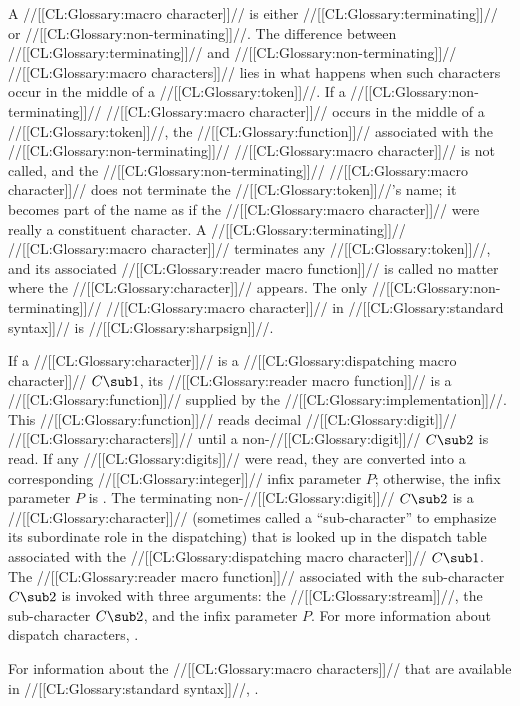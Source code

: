 A //[[CL:Glossary:macro character]]// is either //[[CL:Glossary:terminating]]// or //[[CL:Glossary:non-terminating]]//.
The difference between //[[CL:Glossary:terminating]]// and //[[CL:Glossary:non-terminating]]// //[[CL:Glossary:macro characters]]// 
lies in what happens when such characters occur in the middle of a //[[CL:Glossary:token]]//.  
If a //[[CL:Glossary:non-terminating]]// //[[CL:Glossary:macro character]]// occurs in the middle of a //[[CL:Glossary:token]]//,
the //[[CL:Glossary:function]]// associated 
with the //[[CL:Glossary:non-terminating]]// //[[CL:Glossary:macro character]]// is not called,
and the
//[[CL:Glossary:non-terminating]]// //[[CL:Glossary:macro character]]// does not terminate the //[[CL:Glossary:token]]//'s name; it
becomes part of the name as if the //[[CL:Glossary:macro character]]// were really a constituent
character.  A //[[CL:Glossary:terminating]]// //[[CL:Glossary:macro character]]// terminates any //[[CL:Glossary:token]]//,
and its associated //[[CL:Glossary:reader macro function]]//
is called no matter where the //[[CL:Glossary:character]]// appears.
The only //[[CL:Glossary:non-terminating]]// //[[CL:Glossary:macro character]]// in //[[CL:Glossary:standard syntax]]// 
is //[[CL:Glossary:sharpsign]]//.

If a //[[CL:Glossary:character]]// is a //[[CL:Glossary:dispatching macro character]]// $C\sub 1$,
its //[[CL:Glossary:reader macro function]]// is a //[[CL:Glossary:function]]// supplied by the //[[CL:Glossary:implementation]]//.
This //[[CL:Glossary:function]]// reads decimal //[[CL:Glossary:digit]]// //[[CL:Glossary:characters]]// until a non-//[[CL:Glossary:digit]]//
$C\sub 2$ is read.
If any //[[CL:Glossary:digits]]// were read,
they are converted into a corresponding //[[CL:Glossary:integer]]// infix parameter $P$;
otherwise, the infix parameter $P$ is \nil.  
The terminating non-//[[CL:Glossary:digit]]// $C\sub 2$ is a //[[CL:Glossary:character]]// 
(sometimes called a ``sub-character'' to emphasize its subordinate role in the dispatching)
that is looked up in the dispatch table associated with
the //[[CL:Glossary:dispatching macro character]]// $C\sub 1$.
The //[[CL:Glossary:reader macro function]]// associated with the sub-character $C\sub 2$ 
is invoked with three arguments:
     the //[[CL:Glossary:stream]]//,
     the sub-character $C\sub 2$,
 and the infix parameter $P$.
For more information about dispatch characters,
.

For information about the //[[CL:Glossary:macro characters]]// 
that are available in //[[CL:Glossary:standard syntax]]//,
\seesection\StandardMacroChars.

